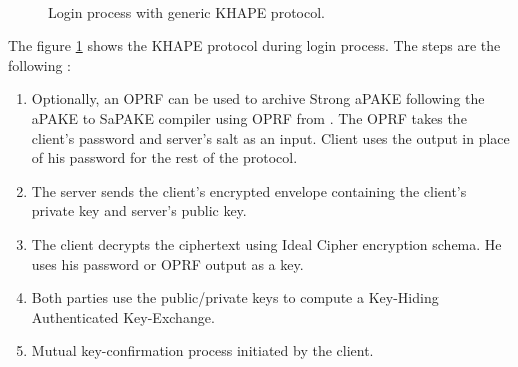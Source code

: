 ﻿\documentclass[../report.tex]{subfiles}
\begin{document}
\paragraph{}

\begin{figure}[h]
 \centering
 
 \setlength{\fboxsep}{10pt}
 \setlength{\fboxrule}{1pt}
 
 \caption{Login process with generic KHAPE protocol.}
 \label{fig:Generic_KHAPE}
\end{figure}
The figure \ref{fig:Generic_KHAPE} shows the KHAPE protocol during login process.
The steps are the following :
\begin{enumerate}
 \item Optionally, an OPRF can be used to archive Strong aPAKE following the aPAKE to SaPAKE compiler using OPRF from \cite{OPAQUE_Paper}. The OPRF takes the client's password and server's salt as an input. Client uses the output in place of his password for the rest of the protocol.
 \item The server sends the client's encrypted envelope containing the client's private key and server's public key.
 \item The client decrypts the ciphertext using Ideal Cipher encryption schema. He uses his password or OPRF output as a key.
 \item Both parties use the public/private keys to compute a Key-Hiding Authenticated Key-Exchange.
 \item Mutual key-confirmation process initiated by the client.
\end{enumerate}
\end{document}
